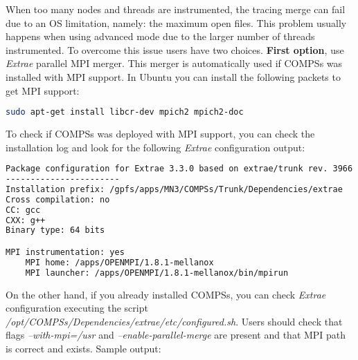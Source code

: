 When too many nodes and threads are instrumented, the tracing merge can fail due to an OS limitation, namely: the maximum open files. This problem usually happens when using advanced mode due to the larger number of threads instrumented. To overcome this issue users have two choices. \textbf{First option}, use \textit{Extrae} parallel MPI merger. This merger is automatically used if COMPSs was installed with MPI support. In Ubuntu you can install the following packets to get MPI support:

\begin{lstlisting}[language=bash]
sudo apt-get install libcr-dev mpich2 mpich2-doc
\end{lstlisting}

To check if COMPSs was deployed with MPI support, you can check the installation log and look for the following \textit{Extrae} configuration output:

\begin{lstlisting}[language=bash]
Package configuration for Extrae 3.3.0 based on extrae/trunk rev. 3966:
-----------------------
Installation prefix: /gpfs/apps/MN3/COMPSs/Trunk/Dependencies/extrae
Cross compilation: no
CC: gcc
CXX: g++
Binary type: 64 bits

MPI instrumentation: yes
	MPI home: /apps/OPENMPI/1.8.1-mellanox
	MPI launcher: /apps/OPENMPI/1.8.1-mellanox/bin/mpirun
\end{lstlisting}

On the other hand, if you already installed COMPSs, you can check \textit{Extrae} configuration executing the script \textit{/opt/COMPSs/Dependencies/extrae/etc/configured.sh}. Users should check that flags \textit{--with-mpi=/usr} and \textit{--enable-parallel-merge} are present and that MPI path is correct and exists. Sample output:


